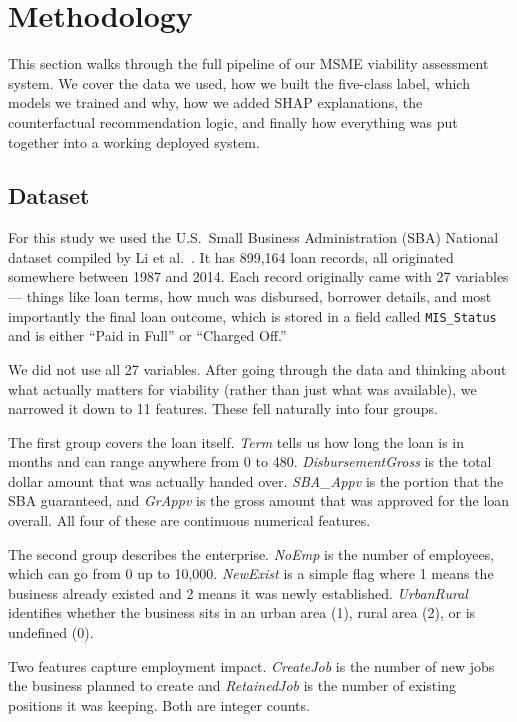 \section{Methodology}

This section walks through the full pipeline of our MSME viability assessment system. We cover the data we used, how we built the five-class label, which models we trained and why, how we added SHAP explanations, the counterfactual recommendation logic, and finally how everything was put together into a working deployed system.

\subsection{Dataset}

For this study we used the U.S.\ Small Business Administration (SBA) National dataset compiled by Li et al.\ \cite{8}. It has 899,164 loan records, all originated somewhere between 1987 and 2014. Each record originally came with 27 variables --- things like loan terms, how much was disbursed, borrower details, and most importantly the final loan outcome, which is stored in a field called \texttt{MIS\_Status} and is either ``Paid in Full'' or ``Charged Off.''

We did not use all 27 variables. After going through the data and thinking about what actually matters for viability (rather than just what was available), we narrowed it down to 11 features. These fell naturally into four groups.

The first group covers the loan itself. \textit{Term} tells us how long the loan is in months and can range anywhere from 0 to 480. \textit{DisbursementGross} is the total dollar amount that was actually handed over. \textit{SBA\_Appv} is the portion that the SBA guaranteed, and \textit{GrAppv} is the gross amount that was approved for the loan overall. All four of these are continuous numerical features.

The second group describes the enterprise. \textit{NoEmp} is the number of employees, which can go from 0 up to 10,000. \textit{NewExist} is a simple flag where 1 means the business already existed and 2 means it was newly established. \textit{UrbanRural} identifies whether the business sits in an urban area (1), rural area (2), or is undefined (0).

Two features capture employment impact. \textit{CreateJob} is the number of new jobs the business planned to create and \textit{RetainedJob} is the number of existing positions it was keeping. Both are integer counts.

